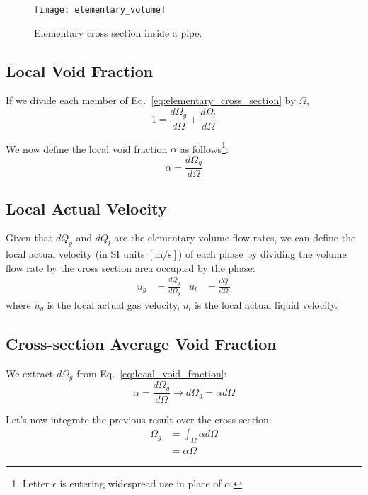 \begin{figure}[htp]
    \centering
    \texttt{[image: elementary\_volume]}
    \caption{Elementary cross section inside a
    pipe.\label{fig:elementary_cross_section}}
\end{figure}

\subsection{Local Void Fraction}
If we divide each member of  Eq.~\ref{eq:elementary_cross_section} by $\Omega$,
\begin{equation*}
    1 = \frac{d\Omega_g}{d\Omega} + \frac{d\Omega_l}{d\Omega}
\end{equation*}

We now define the local void fraction $\alpha$ as follows\footnote{Letter
$\epsilon$ is entering widespread use in place of $\alpha$.}:
\begin{equation}
    \alpha=\frac{d\Omega_g}{d\Omega}
    \label{eq:local_void_fraction}
\end{equation}

\subsection{Local Actual Velocity}
Given that $dQ_g$ and $dQ_l$ are the elementary volume flow rates, we can define
the local actual velocity (in SI units $[\si{\metre\per\second}]$) of each phase
by dividing the volume flow rate by the cross section area occupied by the
phase:
\begin{align}
    u_g &= \frac{dQ_g}{d\Omega_g} & u_l &= \frac{dQ_l}{d\Omega_l}
    \label{eq:local_actual_velocity}
\end{align}
where $u_g$ is the local actual gas velocity, $u_l$ is the local actual liquid
velocity.

\subsection{Cross-section Average Void Fraction}
We extract $d\Omega_g$ from Eq.~\ref{eq:local_void_fraction}:
\begin{equation*}
    \alpha=\frac{d\Omega_g}{d\Omega} \to d\Omega_g = \alpha d\Omega
\end{equation*}

Let's now integrate the previous result over the cross section:
\begin{align*}
    \Omega_g &= \int_\Omega \alpha d\Omega \\
    &= \bar{\alpha}\Omega
\end{align*}

